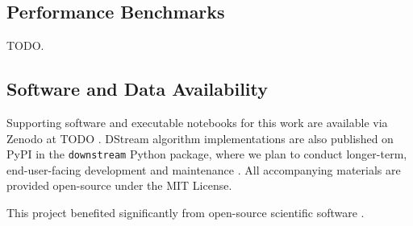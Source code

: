 \subsection{Performance Benchmarks}

TODO.

\subsection{Software and Data Availability} \label{sec:materials}



Supporting software and executable notebooks for this work are available via Zenodo at TODO \citep{moreno2024hsurf}.
DStream algorithm implementations are also published on PyPI in the \texttt{downstream} Python package, where we plan to conduct longer-term, end-user-facing development and maintenance \citep{moreno2024downstream}.
All accompanying materials are provided open-source under the MIT License.

This project benefited significantly from open-source scientific software \citep{2020SciPy-NMeth,harris2020array,reback2020pandas,mckinney-proc-scipy-2010,waskom2021seaborn,hunter2007matplotlib,moreno2023teeplot}.
